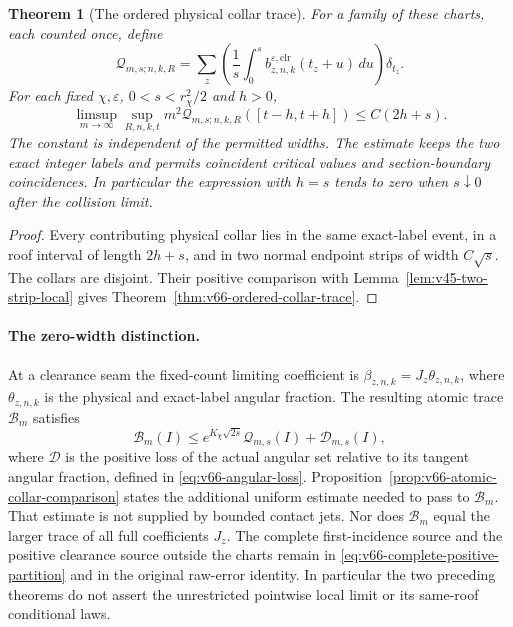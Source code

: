 \documentclass[11pt,reqno]{amsart}
\numberwithin{equation}{section}
\newtheorem{leadtheorem}{Theorem}
\theoremstyle{definition}\newtheorem{definition}[theorem]{Definition}
\theoremstyle{remark}\newtheorem{remark}[theorem]{Remark}
\begin{document}
\begin{leadtheorem}[The ordered physical collar trace]
\label{thm:intro-v66-trace}
For a family of these charts, each counted once, define
\[
 \mathcal Q_{m,s;n,k,R}
 =\sum_z\left(\frac1s\int_0^s
           b_{z,n,k}^{\varepsilon,\mathrm{clr}}(t_z+u)\,du\right)\delta_{t_z}.
\]
For each fixed $\chi,\varepsilon$, $0<s<r_\chi^2/2$ and $h>0$,
\[
 \limsup_{m\to\infty}\sup_{R,n,k,t}m^2
          \mathcal Q_{m,s;n,k,R}([t-h,t+h])\le C(2h+s).
\]
The constant is independent of the permitted widths. The estimate
keeps the two exact integer labels and permits coincident critical
values and section-boundary coincidences. In particular the expression
with $h=s$ tends to zero when $s\downarrow0$ after the collision limit.
\end{leadtheorem}
\begin{proof}
Every contributing physical collar lies in the same exact-label event,
in a roof interval of length $2h+s$, and in two normal endpoint strips
of width $C\sqrt s$. The collars are disjoint. Their positive comparison
with Lemma~\ref{lem:v45-two-strip-local} gives
Theorem~\ref{thm:v66-ordered-collar-trace}.
\end{proof}

\paragraph{The zero-width distinction.}
At a clearance seam the fixed-count limiting coefficient is
$\beta_{z,n,k}=J_z\theta_{z,n,k}$, where $\theta_{z,n,k}$ is the
physical and exact-label angular fraction. The resulting atomic trace
$\mathcal B_m$ satisfies
\[
 \mathcal B_m(I)\le e^{K_\chi\sqrt{2s}}\mathcal Q_{m,s}(I)
                            +\mathcal D_{m,s}(I),
\]
where $\mathcal D$ is the positive loss of the actual angular set
relative to its tangent angular fraction, defined in
\eqref{eq:v66-angular-loss}. Proposition~\ref{prop:v66-atomic-collar-comparison}
states the additional uniform estimate needed to pass to $\mathcal B_m$.
That estimate is not supplied by bounded contact jets. Nor does
$\mathcal B_m$ equal the larger trace of all full coefficients $J_z$.
The complete first-incidence source and the positive clearance source
outside the charts remain in
\eqref{eq:v66-complete-positive-partition} and in the original raw-error
identity. In particular the two preceding theorems do not assert the
unrestricted pointwise local limit or its same-roof conditional laws.
\end{document}

